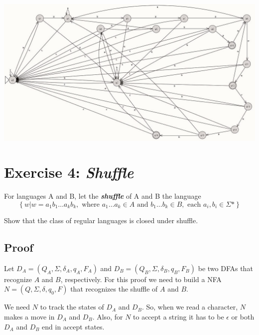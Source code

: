 \documentclass[12pt]{article}
\begin{document}
\begin{minipage}{\textwidth}
    \centering
    \includegraphics[width=1\linewidth]{Tarea 2 DFA 3.c.jpg}
    \label{DFA 2}
\end{minipage}


\section{Exercise 4: \textit{Shuffle}}

For languages A and B, let the \textbf{\textit{shuffle}} of A and B the language
\begin{equation*}
    \left\{ w | w = a_1 b_1 \ldots a_k b_k , \text{ where } a_1 \ldots a_k \in A \text{ and } b_1 \ldots b_k \in B, \text{ each } a_i, b_i \in \Sigma \text{*} \right\}
\end{equation*}

Show that the class of regular languages is closed under shuffle.

\subsection{Proof}

Let $D_A = (Q_A, \Sigma, \delta_A, q_A, F_A)$ and $D_B = (Q_B, \Sigma, \delta_B, q_B, F_B)$ be two DFAs that recognize $A$ and $B$, respectively.  For this proof we need to build a NFA $N = (Q, \Sigma, \delta, q_0, F)$ that recognizes the shuffle of $A$ and $B$.

We need $N$ to track the states of $D_A$ and $D_B$. So, when we read a character, $N$ makes a move in $D_A$ and $D_B$. Also, for $N$ to accept a string it has to be $\epsilon$ or both $D_A$ and $D_B$ end in accept states. 
\end{document}
